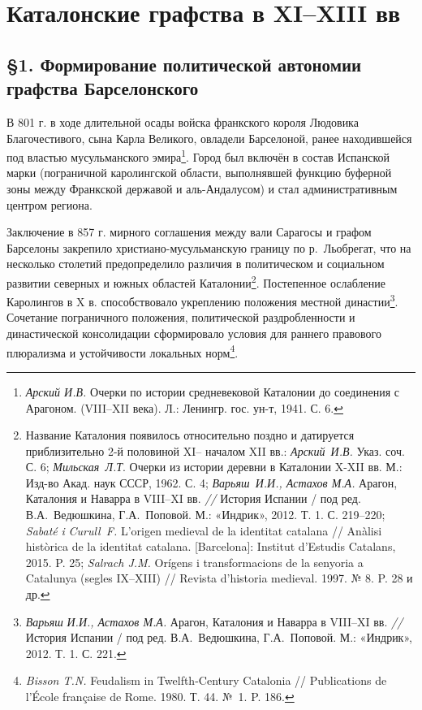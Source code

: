 
\section*{Каталонские графства в XI--XIII вв}

\subsection*{§1. Формирование политической автономии графства Барселонского}

В 801 г. в ходе длительной осады войска франкского короля Людовика Благочестивого, сына Карла Великого, овладели Барселоной, ранее находившейся под властью мусульманского эмира\footnote{\emph{Арский И.В. }Очерки по истории средневековой Каталонии до соединения с Арагоном. (VIII--XII века). Л.: Ленингр. гос. ун-т, 1941. С. 6.}. Город был включён в состав Испанской марки (пограничной каролингской области, выполнявшей функцию буферной зоны между Франкской державой и аль-Андалусом) и стал административным центром региона.

Заключение в 857 г. мирного соглашения между вали Сарагосы и графом Барселоны закрепило христиано-мусульманскую границу по р.~Льобрегат, что на несколько столетий предопределило различия в политическом и социальном развитии северных и южных областей Каталонии\footnote{Название Каталония появилось относительно поздно и датируется приблизительно 2-й половиной XI-- началом XII вв.: \emph{Арский~И.В.} Указ. соч. С. 6; \emph{Мильская}\emph{~Л.Т}. Очерки из истории деревни в Каталонии X-XII вв. М.: Изд-во Акад. наук СССР, 1962. С. 4; \emph{Варьяш}\emph{~}\emph{И.И., Астахов М.А.} Арагон, Каталония и Наварра в VIII--XI вв. \emph{// }История Испании / под ред. В.А.~Ведюшкина, Г.А.~Поповой. М.: «Индрик», 2012. Т. 1. С. 219--220; \emph{Sabat}\emph{é }\emph{i}\emph{ }\emph{Curull}\emph{~}\emph{F}\emph{.} L’origen medieval de la identitat catalana // Anàlisi històrica de la identitat catalana. [Barcelona]: Institut d’Estudis Catalans, 2015. P. 25; \emph{Salrach J.M.} Orígens i transformacions de la senyoria a Catalunya (segles IX--XIII) // Revista d’historia medieval. 1997. № 8. P. 28 и др.}. Постепенное ослабление Каролингов в X в. способствовало укреплению положения местной династии\footnote{\emph{Варьяш}\emph{ И.И., Астахов М.А.} Арагон, Каталония и Наварра в VIII--XI вв. \emph{// }История Испании / под ред. В.А.~Ведюшкина, Г.А.~Поповой. М.: «Индрик», 2012. Т. 1. С. 221.}. Сочетание пограничного положения, политической раздробленности и династической консолидации сформировало условия для раннего правового плюрализма и устойчивости локальных норм\footnote{\emph{Bisson T.N.} Feudalism in Twelfth-Century Catalonia // Publications de l’École française de Rome. 1980. Т. 44. №~1. P. 186.}.

